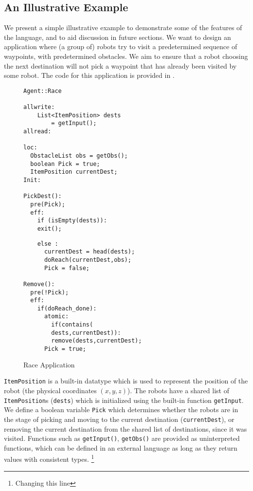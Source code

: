  \subsection[h]{An Illustrative Example}
\label{sect:Eg}
We present a simple illustrative example to demonstrate some of the features of the language, and to aid discussion in future sections. We want to design an application where (a group of) robots try to visit a predetermined sequence of waypoints, with predetermined obstacles. We aim to ensure that a robot choosing the next destination will not pick a waypoint that has already been visited by some robot. The code for this application is provided in .

\begin{figure}[ht!]
\label{fig:Race}
\noindent\begin{minipage}{.5\textwidth}

\begin{lstlisting}
Agent::Race

allwrite:
	List<ItemPosition> dests 
    	= getInput();
allread:

loc:
  ObstacleList obs = getObs();
  boolean Pick = true; 
  ItemPosition currentDest;
Init:

PickDest():
  pre(Pick);
  eff:
    if (isEmpty(dests)):
    exit();   
 \end{lstlisting}
 \end{minipage}\hfill
\noindent\begin{minipage}{.5\textwidth}

\begin{lstlisting}
    else :
      currentDest = head(dests);
      doReach(currentDest,obs);
      Pick = false;
      
Remove():
  pre(!Pick);
  eff:
    if(doReach_done):
      atomic:
        if(contains(
        dests,currentDest)):
        remove(dests,currentDest);
   	  Pick = true;
 \end{lstlisting}
 \end{minipage}\hfill
 \caption{Race Application}
 \end{figure}
\verb|ItemPosition| is a built-in datatype which is used to represent the position of the robot (the physical coordinates $(x,y,z)$). The robots have a shared list of \verb|ItemPosition|s (\verb|dests|) which is initialized using the built-in function \verb|getInput|. We define a boolean variable \verb|Pick| which determines whether the robots are in the stage of picking and moving to the current destination (\verb|currentDest|), or removing the current destination from the shared list of destinations, since it was visited. Functions such as \verb|getInput()|, \verb|getObs()| are provided as uninterpreted functions, which can be defined in an external language as long as they return values with consistent types. \footnote{Changing this line}

